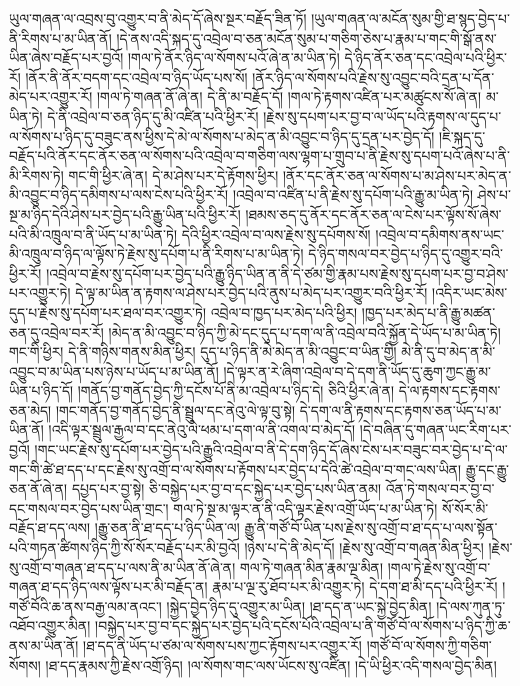ཡུལ་གཞན་ལ་འབྲས་བུ་འགྱུར་བ་ནི་མེད་དོ་ཞེས་སྔར་བརྗོད་ཟིན་ཏོ། །ཡུལ་གཞན་ལ་མངོན་སུམ་གྱི་ཐ་སྙད་བྱེད་པ་ནི་རིགས་པ་མ་ཡིན་ནོ། །དེ་ནས་འདི་སྐད་དུ་འབྲེལ་བ་ཅན་མངོན་སུམ་པ་གཅིག་ཅེས་པ་རྣམ་པ་གང་གི་སྒོ་ནས་ཡིན་ཞེས་བརྗོད་པར་བྱའོ། །གལ་ཏེ་ནོར་ཉིད་ལ་སོགས་པའོ་ཞེ་ན་མ་ཡིན་ཏེ། དེ་ཉིད་ནོར་ཅན་དང་འབྲེལ་པའི་ཕྱིར་རོ། །ནོར་ནི་ནོར་བདག་དང་འབྲེལ་བ་ཉིད་ཡོད་པས་སོ། །ནོར་ཉིད་ལ་སོགས་པའི་རྗེས་སུ་འབྱུང་བའི་དྲན་པ་དོན་མེད་པར་འགྱུར་རོ། །གལ་ཏེ་གཞན་ནོ་ཞེ་ན། དེ་ནི་མ་བརྗོད་དོ། །གལ་ཏེ་རྟགས་འཛིན་པར་མཚུངས་སོ་ཞེ་ན། མ་ཡིན་ཏེ། དེ་ནི་འབྲེལ་བ་ཅན་ཉིད་དུ་མི་འཛིན་པའི་ཕྱིར་རོ། །རྗེས་སུ་དཔག་པར་བྱ་བ་ལ་ཡོད་པའི་རྟགས་ལ་དུད་པ་ལ་སོགས་པ་ཉིད་དུ་བཟུང་ནས་ཕྱིས་དེ་མེ་ལ་སོགས་པ་མེད་ན་མི་འབྱུང་བ་ཉིད་དུ་དྲན་པར་བྱེད་དོ། །ཇི་སྐད་དུ་བརྗོད་པའི་ནོར་དང་ནོར་ཅན་ལ་སོགས་པའི་འབྲེལ་བ་གཅིག་ལས་ལྷག་པ་གྲུབ་པ་ནི་རྗེས་སུ་དཔག་པའོ་ཞེས་པ་ནི་མི་རིགས་ཏེ། གང་གི་ཕྱིར་ཞེ་ན། དེ་མ་ཤེས་པར་དེ་རྟོགས་ཕྱིར། །ནོར་དང་ནོར་ཅན་ལ་སོགས་པ་མ་ཤེས་པར་མེད་ན་མི་འབྱུང་བ་ཉིད་དམིགས་པ་ལས་ངེས་པའི་ཕྱིར་རོ། །འབྲེལ་བ་འཛིན་པ་ནི་རྗེས་སུ་དཔོག་པའི་རྒྱུ་མ་ཡིན་ཏེ། ཤེས་པ་སྔ་མ་ཉིད་དེའི་ཤེས་པར་བྱེད་པའི་རྒྱུ་ཡིན་པའི་ཕྱིར་རོ། །ཐམས་ཅད་དུ་ནོར་དང་ནོར་ཅན་ལ་ངེས་པར་ལྟོས་སོ་ཞེས་པའི་མི་འཁྲུལ་བ་ནི་ཡོད་པ་མ་ཡིན་ཏེ། དེའི་ཕྱིར་འབྲེལ་བ་ལས་རྗེས་སུ་དཔོགས་སོ། །འབྲེལ་བ་དམིགས་ནས་ཡང་མི་འཁྲུལ་བ་ཉིད་ལ་ལྟོས་ཏེ་རྗེས་སུ་དཔོག་པ་ནི་རིགས་པ་མ་ཡིན་ཏེ། དེ་ཉིད་གསལ་བར་བྱེད་པ་ཉིད་དུ་འགྱུར་བའི་ཕྱིར་རོ། །འབྲེལ་བ་རྗེས་སུ་དཔོག་པར་བྱེད་པའི་རྒྱུ་ཉིད་ཡིན་ན་ནི་དེ་ཙམ་གྱི་རྣམ་པས་རྗེས་སུ་དཔག་པར་བྱ་བ་ཤེས་པར་འགྱུར་ཏེ། དེ་ལྟ་མ་ཡིན་ན་རྟགས་ལ་ཤེས་པར་བྱེད་པའི་ནུས་པ་མེད་པར་འགྱུར་བའི་ཕྱིར་རོ། །འདིར་ཡང་མེས་དུད་པ་རྗེས་སུ་དཔོག་པར་ཐལ་བར་འགྱུར་ཏེ། འབྲེལ་བ་ཁྱད་པར་མེད་པའི་ཕྱིར། །ཁྱད་པར་མེད་པ་ནི་རྒྱུ་མཚན་ཅན་དུ་འབྲེལ་བར་རོ། །མེད་ན་མི་འབྱུང་བ་ཉིད་ཀྱི་མེ་དང་དུད་པ་དག་ལ་ནི་འབྲེལ་བའི་སྐྱོན་དེ་ཡོད་པ་མ་ཡིན་ཏེ། གང་གི་ཕྱིར། དེ་ནི་གཉིས་གནས་མིན་ཕྱིར། དུད་པ་ཉིད་ནི་མེ་མེད་ན་མི་འབྱུང་བ་ཡིན་གྱི། མེ་ནི་དུ་བ་མེད་ན་མི་འབྱུང་བ་མ་ཡིན་པས་ཉེས་པ་ཡོད་པ་མ་ཡིན་ནོ། །དེ་ལྟར་ན་རེ་ཞིག་འབྲེལ་བ་དེ་དག་ནི་ཡོད་དུ་ཆུག་ཀྱང་རྒྱུ་མ་ཡིན་པ་ཉིད་དོ། །གནོད་བྱ་གནོད་བྱེད་ཀྱི་དངོས་པོ་ནི་མ་འབྲེལ་པ་ཉིད་དེ། ཅིའི་ཕྱིར་ཞེ་ན། དེ་ལ་རྟགས་དང་རྟགས་ཅན་མེད། །གང་གནོད་བྱ་གནོད་བྱེད་ནི་སྦྲུལ་དང་ནེའུ་ལེ་ལྟ་བུ་སྟེ། དེ་དག་ལ་ནི་རྟགས་དང་རྟགས་ཅན་ཡོད་པ་མ་ཡིན་ནོ། །འདི་ལྟར་སྦྲུལ་རྒྱལ་བ་དང་ནེའུ་ལེ་ཕམ་པ་དག་ལ་ནི་འགལ་བ་མེད་དོ། །དེ་བཞིན་དུ་གཞན་ཡང་རིག་པར་བྱའོ། །གང་ཡང་རྗེས་སུ་དཔོག་པར་བྱེད་པའི་རྒྱུའི་འབྲེལ་བ་ནི་དེ་དག་ཉིད་དོ་ཞེས་ངེས་པར་བཟུང་བར་བྱེད་པ་དེ་ལ་གང་གི་ཚེ་ཐ་དད་པ་དང་རྗེས་སུ་འགྲོ་བ་ལ་སོགས་པ་རྟོགས་པར་བྱེད་པ་དེའི་ཚེ་འབྲེལ་བ་གང་ལས་ཡིན། རྒྱུ་དང་རྒྱུ་ཅན་ནོ་ཞེ་ན། དཔྱད་པར་བྱ་སྟེ། ཅི་བསྐྱེད་པར་བྱ་བ་དང་སྐྱེད་པར་བྱེད་པས་ཡིན་ནམ། འོན་ཏེ་གསལ་བར་བྱ་བ་དང་གསལ་བར་བྱེད་པས་ཡིན་གྲང་། གལ་ཏེ་སྔ་མ་ལྟར་ན་ནི་འདི་ལྟར་རྗེས་འགྲོ་ཡོད་པ་མ་ཡིན་ཏེ། སོ་སོར་མི་བརྗོད་ཐ་དད་ལས། །རྒྱུ་ཅན་ནི་ཐ་དད་པ་ཉིད་ཡིན་ལ། རྒྱུ་ནི་གཙོ་བོ་ཡིན་པས་རྗེས་སུ་འགྲོ་བ་ཐ་དད་པ་ལས་སྟོན་པའི་གཏན་ཚིགས་ཉིད་ཀྱི་སོ་སོར་བརྗོད་པར་མི་བྱའོ། །ཉེས་པ་དེ་ནི་མེད་དོ། །རྗེས་སུ་འགྲོ་བ་གཞན་མིན་ཕྱིར། །རྗེས་སུ་འགྲོ་བ་གཞན་ཐ་དད་པ་ལས་ནི་མ་ཡིན་ནོ་ཞེ་ན། གལ་ཏེ་གཞན་མིན་རྣམ་ལྔ་མིན། །གལ་ཏེ་རྗེས་སུ་འགྲོ་བ་གཞན་ཐ་དད་ཉིད་ལས་ལྟོས་པར་མི་བརྗོད་ན། རྣམ་པ་ལྔ་རུ་ཐོབ་པར་མི་འགྱུར་ཏེ། དེ་དག་ཐ་མི་དད་པའི་ཕྱིར་རོ། །གཙོ་བོའི་ཆ་ནས་བརྒྱ་ལམ་ནའང་། །སྐྱེད་བྱེད་ཉིད་དུ་འགྱུར་མ་ཡིན། །ཐ་དད་ན་ཡང་སྐྱེ་བྱེད་མིན། །དེ་ལས་ཀུན་ཏུ་འཐོབ་འགྱུར་མིན། །བསྐྱེད་པར་བྱ་བ་དང་སྐྱེད་པར་བྱེད་པའི་དངོས་པོའི་འབྲེལ་པ་ནི་གཙོ་བོ་ལ་སོགས་པ་ཉིད་ཀྱི་ཆ་ནས་མ་ཡིན་ནོ། །ཐ་དད་ནི་ཡོད་པ་ཙམ་ལ་སོགས་པས་ཀྱང་རྟོགས་པར་འགྱུར་རོ། །གཙོ་བོ་ལ་སོགས་ཀྱི་གཅིག་སོགས། །ཐ་དད་རྣམས་ཀྱི་རྗེས་འགྲོ་ཉིད། །ལ་སོགས་གང་ལས་ཡོངས་སུ་འཛིན། །དེ་ཡི་ཕྱིར་འདི་གསལ་བྱེད་མིན། 